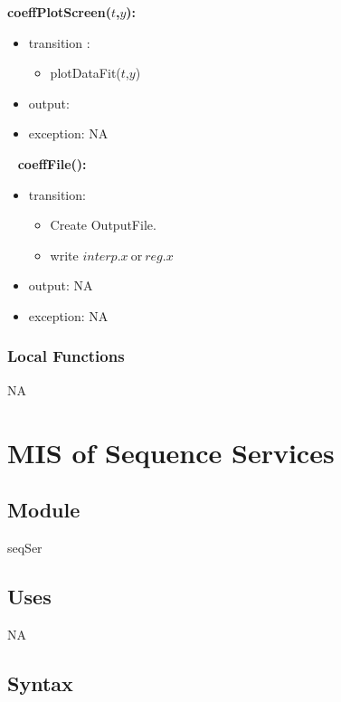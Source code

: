 \documentclass[12pt, titlepage]{article}
\begin{document}
\noindent \textbf{coeffPlotScreen($t$,$y$):}
\begin{itemize}
	\item transition :
	\begin{itemize}
		\item plotDataFit($t$,$y$)
	\end{itemize}
	\item output:  
	\item exception: NA
\end{itemize}


~\newline
\noindent \textbf{coeffFile():}
\begin{itemize}
	\item transition: 
	\begin{itemize}
		
		\item Create OutputFile. 
		\item write $interp.x\ \text{or}\ reg.x$
	\end{itemize}
	\item output: NA
	\item exception: NA 
\end{itemize}

\subsubsection{Local Functions}

NA




\section{MIS of Sequence Services} \label{seqSer} 

\subsection{Module}

seqSer 

\subsection{Uses} 
NA
\subsection{Syntax}
\end{document}
